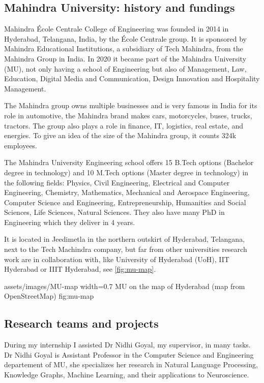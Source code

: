 \subsection{Mahindra University: history and fundings}

Mahindra École Centrale College of Engineering was founded in 2014 in Hyderabad,
Telangana, India, by the École Centrale group. It is sponsored by Mahindra
Educational Institutions, a subsidiary of Tech Mahindra, from the Mahindra
Group in India. In 2020 it became part of the Mahindra University (MU), not only
having a school of Engineering but also of Management, Law, Education, Digital
Media and Communication, Design Innovation and Hospitality Management. 

The Mahindra group owns multiple businesses and is very famous in India for its
role in automotive, the Mahindra brand makes cars, motorcycles, buses, trucks,
tractors. The group also plays a role in finance, IT, logistics, real estate,
and energies. To give an idea of the size of the Mahindra group, it counts 324k
employees.

The Mahindra University Engineering school offers 15 B.Tech options (Bachelor
degree in technology) and 10 M.Tech options (Master degree in technology) in the
following fields: Physics, Civil Engineering, Electrical and Computer
Engineering, Chemistry, Mathematics, Mechanical and Aerospace Engineering,
Computer Science and Engineering, Entrepreneurship, Humanities and Social
Sciences, Life Sciences, Natural Sciences. They also have many PhD in
Engineering which they deliver in 4 years.

It is located in Jeedimetla in the northern outskirt of Hyderabad, Telangana,
next to the Tech Machindra company, but far from other universities research
work are in collaboration with, like University of Hyderabad (UoH), IIT
Hyderabad or IIIT Hyderabad, see \cref{fig:mu-map}.

\insertfigure
    {assets/images/MU-map}
    {width=0.7\textwidth}
    {MU on the map of Hyderabad (map from OpenStreetMap)}
    {fig:mu-map}

\subsection{Research teams and projects}

During my internship I assisted Dr Nidhi Goyal, my supervisor, in many tasks. Dr
Nidhi Goyal is Assistant Professor in the Computer Science and Engineering
departement of MU, she specializes her research in Natural Language Processing,
Knowledge Graphs, Machine Learning, and their applications to Neuroscience.
 
